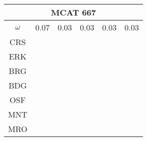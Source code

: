 \documentclass[a4paper,12pt]{article}
\begin{document}
\begin{tabular}{|c|c|c|c|c|c|}%
         \hline \multicolumn{6}{|c|}{MCAT 667} \\ \hline
         $\omega$&0.07&0.03&0.03&0.03&0.03\\ \hline %
        CRS&\cellcolor[HTML]{E41A1C}&\cellcolor[HTML]{E41A1C}&\cellcolor[HTML]{E41A1C}&\cellcolor[HTML]{E41A1C}&\cellcolor[HTML]{E41A1C}\\ \hline %
        ERK&\cellcolor[HTML]{377EB8}&\cellcolor[HTML]{E41A1C}&\cellcolor[HTML]{E41A1C}&\cellcolor[HTML]{377EB8}&\cellcolor[HTML]{E41A1C}\\ \hline %
        BRG&\cellcolor[HTML]{4DAF4A}&\cellcolor[HTML]{E41A1C}&\cellcolor[HTML]{E41A1C}&\cellcolor[HTML]{377EB8}&\cellcolor[HTML]{E41A1C}\\ \hline %
        BDG&\cellcolor[HTML]{4DAF4A}&\cellcolor[HTML]{377EB8}&\cellcolor[HTML]{377EB8}&\cellcolor[HTML]{377EB8}&\cellcolor[HTML]{377EB8}\\ \hline %
        OSF&\cellcolor[HTML]{4DAF4A}&\cellcolor[HTML]{377EB8}&\cellcolor[HTML]{377EB8}&\cellcolor[HTML]{4DAF4A}&\cellcolor[HTML]{4DAF4A}\\ \hline %
        MNT&\cellcolor[HTML]{984EA3}&\cellcolor[HTML]{4DAF4A}&\cellcolor[HTML]{377EB8}&\cellcolor[HTML]{4DAF4A}&\cellcolor[HTML]{4DAF4A}\\ \hline %
        MRO&\cellcolor[HTML]{984EA3}&\cellcolor[HTML]{4DAF4A}&\cellcolor[HTML]{4DAF4A}&\cellcolor[HTML]{984EA3}&\cellcolor[HTML]{984EA3}\\ \hline %

\end{tabular}
\end{document}
